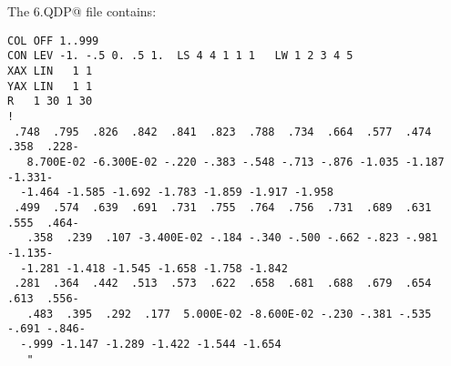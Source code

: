\newpage
\section*{ }
\vspace{10cm}

\vfill
The \verb@FIG6.QDP@ file contains:
{\footnotesize
\begin{verbatim}
COL OFF 1..999
CON LEV -1. -.5 0. .5 1.  LS 4 4 1 1 1   LW 1 2 3 4 5
XAX LIN   1 1
YAX LIN   1 1
R   1 30 1 30
!
 .748  .795  .826  .842  .841  .823  .788  .734  .664  .577  .474  .358  .228-
   8.700E-02 -6.300E-02 -.220 -.383 -.548 -.713 -.876 -1.035 -1.187 -1.331-
  -1.464 -1.585 -1.692 -1.783 -1.859 -1.917 -1.958
 .499  .574  .639  .691  .731  .755  .764  .756  .731  .689  .631  .555  .464-
   .358  .239  .107 -3.400E-02 -.184 -.340 -.500 -.662 -.823 -.981 -1.135-
  -1.281 -1.418 -1.545 -1.658 -1.758 -1.842
 .281  .364  .442  .513  .573  .622  .658  .681  .688  .679  .654  .613  .556-
   .483  .395  .292  .177  5.000E-02 -8.600E-02 -.230 -.381 -.535 -.691 -.846-
  -.999 -1.147 -1.289 -1.422 -1.544 -1.654
   "

\end{verbatim}}

\newpage
